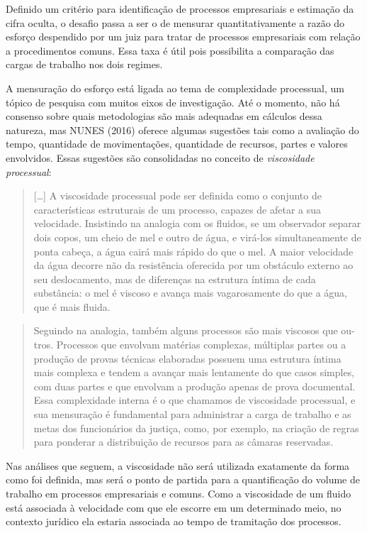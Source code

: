 \documentclass[]{book}
\begin{document}
Definido um critério para identificação de processos empresariais e
estimação da cifra oculta, o desafio passa a ser o de mensurar
quantitativamente a razão do esforço despendido por um juiz para tratar
de processos empresariais com relação a procedimentos comuns. Essa taxa
é útil pois possibilita a comparação das cargas de trabalho nos dois
regimes.

A mensuração do esforço está ligada ao tema de complexidade processual,
um tópico de pesquisa com muitos eixos de investigação. Até o momento,
não há consenso sobre quais metodologias são mais adequadas em cálculos
dessa natureza, mas NUNES (2016) oferece algumas sugestões tais como a
avaliação do tempo, quantidade de movimentações, quantidade de recursos,
partes e valores envolvidos. Essas sugestões são consolidadas no
conceito de \emph{viscosidade processual}:

\begin{quote}
{[}\ldots{}{]} A viscosidade processual pode ser definida como o
conjunto de características estruturais de um processo, capazes de
afetar a sua velocidade. Insistindo na analogia com os fluidos, se um
observador separar dois copos, um cheio de mel e outro de água, e
virá-los simultaneamente de ponta cabeça, a água cairá mais rápido do
que o mel. A maior velocidade da água decorre não da resistência
oferecida por um obstáculo externo ao seu deslocamento, mas de
diferenças na estrutura íntima de cada substância: o mel é viscoso e
avança mais vagarosamente do que a água, que é mais fluida.
\end{quote}

\begin{quote}
Seguindo na analogia, também alguns processos são mais viscosos que ou-
tros. Processos que envolvam matérias complexas, múltiplas partes ou a
produção de provas técnicas elaboradas possuem uma estrutura íntima mais
complexa e tendem a avançar mais lentamente do que casos simples, com
duas partes e que envolvam a produção apenas de prova documental. Essa
complexidade interna é o que chamamos de viscosidade processual, e sua
mensuração é fundamental para administrar a carga de trabalho e as metas
dos funcionários da justiça, como, por exemplo, na criação de regras
para ponderar a distribuição de recursos para as câmaras reservadas.
\end{quote}

Nas análises que seguem, a viscosidade não será utilizada exatamente da
forma como foi definida, mas será o ponto de partida para a
quantificação do volume de trabalho em processos empresariais e comuns.
Como a viscosidade de um fluido está associada à velocidade com que ele
escorre em um determinado meio, no contexto jurídico ela estaria
associada ao tempo de tramitação dos processos.
\end{document}
